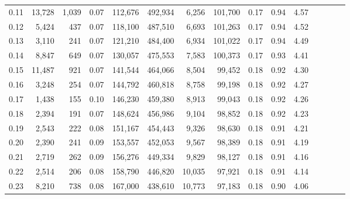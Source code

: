 \begin{tabular}{rrrcrrrrrrrrrrr}
0.11 &  13,728 &   1,039 &                                       0.07 &  112,676 &  492,934 &    6,256 &  101,700 &  0.17 &  0.94 &                         4.57 \\
0.12 &   5,424 &     437 &                                       0.07 &  118,100 &  487,510 &    6,693 &  101,263 &  0.17 &  0.94 &                         4.52 \\
0.13 &   3,110 &     241 &                                       0.07 &  121,210 &  484,400 &    6,934 &  101,022 &  0.17 &  0.94 &                         4.49 \\
0.14 &   8,847 &     649 &                                       0.07 &  130,057 &  475,553 &    7,583 &  100,373 &  0.17 &  0.93 &                         4.41 \\
0.15 &  11,487 &     921 &                                       0.07 &  141,544 &  464,066 &    8,504 &   99,452 &  0.18 &  0.92 &                         4.30 \\
0.16 &   3,248 &     254 &                                       0.07 &  144,792 &  460,818 &    8,758 &   99,198 &  0.18 &  0.92 &                         4.27 \\
0.17 &   1,438 &     155 &                                       0.10 &  146,230 &  459,380 &    8,913 &   99,043 &  0.18 &  0.92 &                         4.26 \\
0.18 &   2,394 &     191 &                                       0.07 &  148,624 &  456,986 &    9,104 &   98,852 &  0.18 &  0.92 &                         4.23 \\
0.19 &   2,543 &     222 &                                       0.08 &  151,167 &  454,443 &    9,326 &   98,630 &  0.18 &  0.91 &                         4.21 \\
0.20 &   2,390 &     241 &                                       0.09 &  153,557 &  452,053 &    9,567 &   98,389 &  0.18 &  0.91 &                         4.19 \\
0.21 &   2,719 &     262 &                                       0.09 &  156,276 &  449,334 &    9,829 &   98,127 &  0.18 &  0.91 &                         4.16 \\
0.22 &   2,514 &     206 &                                       0.08 &  158,790 &  446,820 &   10,035 &   97,921 &  0.18 &  0.91 &                         4.14 \\
0.23 &   8,210 &     738 &                                       0.08 &  167,000 &  438,610 &   10,773 &   97,183 &  0.18 &  0.90 &                         4.06 \\

\end{tabular}
